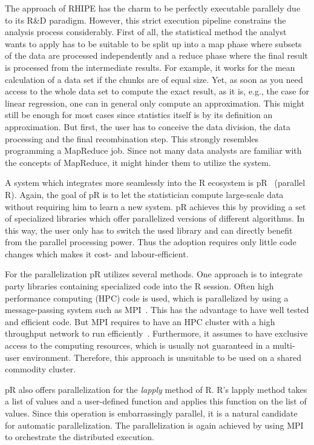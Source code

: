 The approach of RHIPE has the charm to be perfectly executable parallely due to its R\&D paradigm.
However, this strict execution pipeline constrains the analysis process considerably.
First of all, the statistical method the analyst wants to apply has to be suitable to be split up into a map phase where subsets of the data are processed independently and a reduce phase where the final result is processed from the intermediate results.
For example, it works for the mean calculation of a data set if the chunks are of equal size.
Yet, as soon as you need access to the whole data set to compute the exact result, as it is, e.g., the case for linear regression, one can in general only compute an approximation.
This might still be enough for most cases since statistics itself is by its definition an approximation.
But first, the user has to conceive the data division, the data processing and the final recombination step.
This strongly resembles programming a MapReduce job.
Since not many data analysts are familiar with the concepts of MapReduce, it might hinder them to utilize the system.

A system which integrates more seamlessly into the R ecosystem is pR~\cite{samatova:2009a} (parallel R).
Again, the goal of pR is to let the statistician compute large-scale data without requiring him to learn a new system.
pR achieves this by providing a set of specialized libraries which offer parallelized versions of different algorithms.
In this way, the user only has to switch the used library and can directly benefit from the parallel processing power.
Thus the adoption requires only little code changes which makes it cost- and labour-efficient.

For the parallelization pR utilizes several methods.
One approach is to integrate  party libraries containing specialized code into the R session.
Often high performance computing (HPC) code is used, which is parallelized by using a message-passing system such as MPI~\cite{gropp:pc1996a,lusk:2009a}.
This has the advantage to have well tested and efficient code.
But MPI requires to have an HPC cluster with a high throughput network to run efficiently~\cite{sur:2006a}.
Furthermore, it assumes to have exclusive access to the computing resources, which is usually not guaranteed in a multi-user environment.
Therefore, this approach is unsuitable to be used on a shared commodity cluster.

pR also offers parallelization for the \emph{lapply} method of R.
R's lapply method takes a list of values and a user-defined function and applies this function on the list of values.
Since this operation is embarrassingly parallel, it is a natural candidate for automatic parallelization.
The parallelization is again achieved by using MPI to orchestrate the distributed execution.


